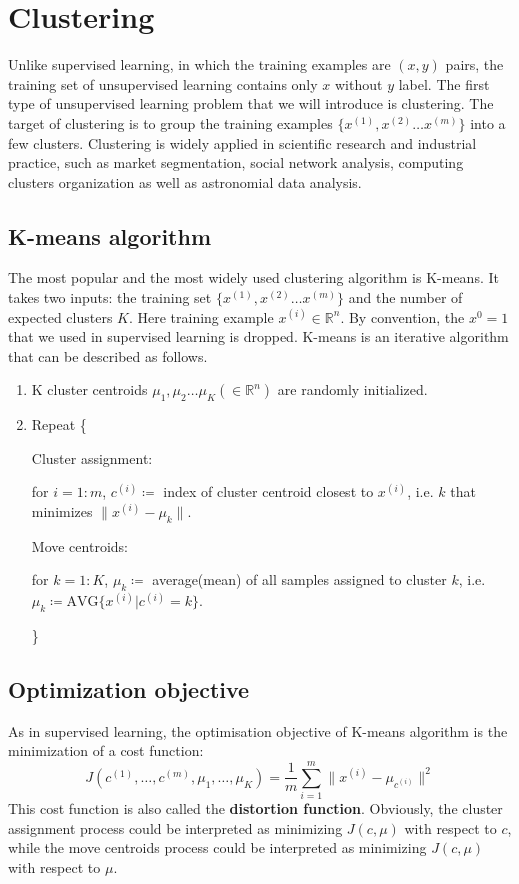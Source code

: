 \ifx\PREAMBLE\undefined


\fi
\section{Clustering}
Unlike supervised learning, in which the training examples are $(x,y)$ pairs, the training set of unsupervised learning contains only $x$ without $y$ label. The first type of unsupervised learning problem that we will introduce is clustering. The target of clustering is to group the training examples $\{x^{(1)}, x^{(2)} \dots x^{(m)}\}$ into a few clusters. Clustering is widely applied in scientific research and industrial practice, such as market segmentation, social network analysis, computing clusters organization as well as astronomial data analysis.
\subsection{K-means algorithm}
The most popular and the most widely used clustering algorithm is K-means. It takes two inputs: the training set $\{x^{(1)}, x^{(2)} \dots x^{(m)}\}$ and the number of expected clusters $K$. Here training example $x^{(i)}\in \mathbb{R}^n$. By convention, the $x^0=1$ that we used in supervised learning is dropped. K-means is an iterative algorithm that can be described as follows.
\begin{enumerate}
\item K cluster centroids $\mu_1, \mu_2 \dots \mu_K (\in\mathbb{R}^n)$ are randomly initialized.
\item Repeat \{

	Cluster assignment:

	\begingroup{}
	for $i=1:m$, $c^{(i)} \coloneqq $ index of cluster centroid closest to $x^{(i)}$, i.e. $k$ that minimizes 
	$\lVert x^{(i)} - \mu_k\rVert$.
	\par\endgroup

	Move centroids:

	\begingroup{}
	for $k=1:K$, $\mu_k \coloneqq$ average(mean) of all samples assigned to cluster $k$, i.e. $\mu_k\coloneqq \text{AVG}\{x^{(i)}|c^{(i)} = k\}$.
	\par\endgroup
\}
\end{enumerate}
\subsection{Optimization objective}
As in supervised learning, the optimisation objective of K-means algorithm is the minimization of a cost function:
\begin{equation}
J(c^{(1)},\dots,c^{(m)},\mu_1,\dots,\mu_K) = \frac{1}{m}\sum\limits_{i=1}^m\lVert x^{(i)} - \mu_{c^{(i)}}\rVert^2 
\end{equation}
This cost function is also called the {\bf distortion function}. Obviously, the cluster assignment process could be interpreted as minimizing $J(c,\mu)$ with respect to $c$, while the move centroids process could be interpreted as minimizing $J(c,\mu)$ with respect to $\mu$.
